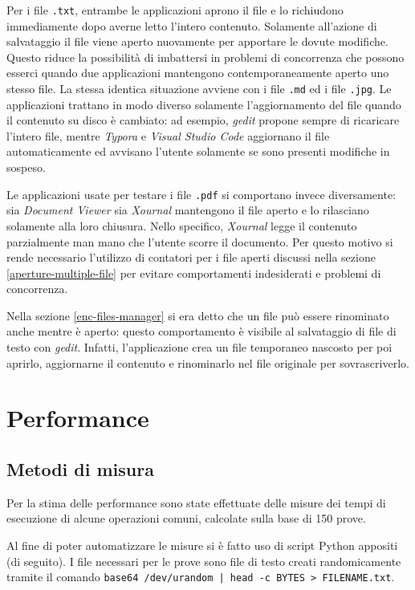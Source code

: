 \documentclass[a4paper,12pt,twoside,openright]{report}
\begin{document}
  Per i file \texttt{.txt}, entrambe le applicazioni aprono il file e lo richiudono
  immediamente dopo averne letto l'intero contenuto. Solamente all'azione di salvataggio il file viene
  aperto nuovamente per apportare le dovute modifiche. Questo riduce la possibilità di imbattersi in problemi
  di concorrenza che possono esserci quando due applicazioni mantengono contemporaneamente aperto uno stesso file.
  La stessa identica situazione avviene con i file \texttt{.md} ed i file \texttt{.jpg}.
  Le applicazioni trattano in modo diverso solamente l'aggiornamento del file quando il
  contenuto su disco è cambiato: ad esempio, \textit{gedit} propone sempre di ricaricare l'intero file, mentre
  \textit{Typora} e \textit{Visual Studio Code} aggiornano il file automaticamente ed avvisano
  l'utente solamente se sono presenti modifiche in sospeso.

  Le applicazioni usate per testare i file \texttt{.pdf} si comportano invece diversamente: sia \textit{Document Viewer}
  sia \textit{Xournal} mantengono il file aperto e lo rilasciano solamente alla loro chiusura.
  Nello specifico, \textit{Xournal} legge il contenuto parzialmente man mano che l'utente scorre il documento.
  Per questo motivo si rende necessario l'utilizzo di contatori per i file aperti discussi nella sezione \ref{aperture-multiple-file}
  per evitare comportamenti indesiderati e problemi di concorrenza.

  Nella sezione \ref{enc-files-manager} si era detto che un file può essere
  rinominato anche mentre è aperto: questo comportamento è visibile al salvataggio di file di testo
  con \textit{gedit}. Infatti, l'applicazione crea un file temporaneo nascosto per poi aprirlo, aggiornarne
  il contenuto e rinominarlo nel file originale per sovrascriverlo.

  \section{Performance}

  \subsection{Metodi di misura}

  Per la stima delle performance sono state effettuate delle misure dei tempi di esecuzione
  di alcune operazioni comuni, calcolate sulla base di 150 prove.
  
  Al fine di poter automatizzare le misure si è fatto uso di script Python appositi (di seguito).
  I file necessari per le prove sono file di testo creati randomicamente tramite il 
  comando \texttt{base64 /dev/urandom | head -c BYTES > FILENAME.txt}.
\end{document}
